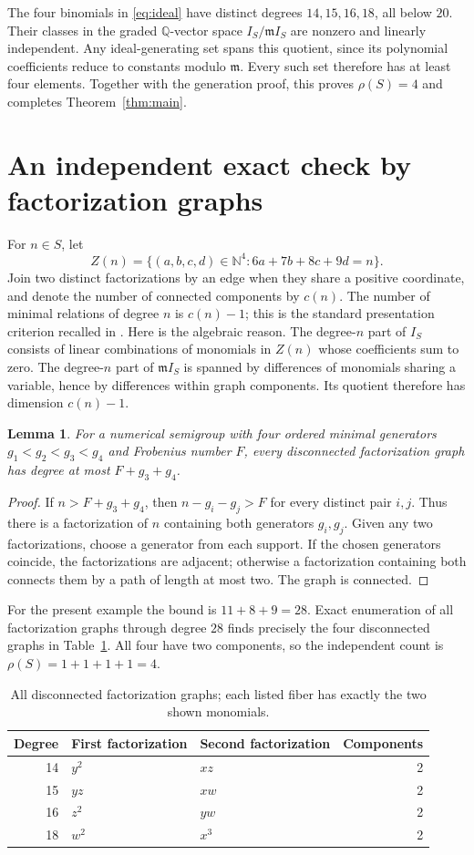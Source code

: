 \documentclass[11pt,a4paper]{article}
\newtheorem{lemma}[theorem]{Lemma}
\newcommand{\NN}{\mathbb N}
\newcommand{\QQ}{\mathbb Q}
\newcommand{\frakm}{\mathfrak m}
\begin{document}
The four binomials in \eqref{eq:ideal} have distinct degrees $14,15,16,18$,
all below $20$. Their classes in the graded $\QQ$-vector space
$I_S/\frakm I_S$ are nonzero and linearly independent. Any ideal-generating
set spans this quotient, since its polynomial coefficients reduce to constants
modulo $\frakm$. Every such set therefore has at least four elements.
Together with the generation proof, this proves $\rho(S)=4$ and completes
Theorem~\ref{thm:main}.

\section{An independent exact check by factorization graphs}
For $n\in S$, let
\[
 Z(n)=\{(a,b,c,d)\in\NN^4:6a+7b+8c+9d=n\}.
\]
Join two distinct factorizations by an edge when they share a positive
coordinate, and denote the number of connected components by $c(n)$.
The number of minimal relations of degree $n$ is $c(n)-1$; this is the
standard presentation criterion recalled in \cite[Theorem 3]{gomes}.
Here is the algebraic reason. The degree-$n$ part of $I_S$ consists of
linear combinations of monomials in $Z(n)$ whose coefficients sum to zero.
The degree-$n$ part of $\frakm I_S$ is spanned by differences of monomials
sharing a variable, hence by differences within graph components.
Its quotient therefore has dimension $c(n)-1$.

\begin{lemma}\label{lem:bound}
For a numerical semigroup with four ordered minimal generators
$g_1<g_2<g_3<g_4$ and Frobenius number $F$, every disconnected
factorization graph has degree at most $F+g_3+g_4$.
\end{lemma}
\begin{proof}
If $n>F+g_3+g_4$, then $n-g_i-g_j>F$ for every distinct pair $i,j$.
Thus there is a factorization of $n$ containing both generators $g_i,g_j$.
Given any two factorizations, choose a generator from each support.
If the chosen generators coincide, the factorizations are adjacent;
otherwise a factorization containing both connects them by a path of
length at most two. The graph is connected.
\end{proof}

For the present example the bound is $11+8+9=28$. Exact enumeration of
all factorization graphs through degree $28$ finds precisely the four
disconnected graphs in Table~\ref{tab:betti}. All four have two components,
so the independent count is $\rho(S)=1+1+1+1=4$.

\begin{table}[ht]
\centering
\begin{tabular}{rllr}
\toprule
Degree & First factorization & Second factorization & Components\\
\midrule
14 & $y^2$ & $xz$ & 2\\
15 & $yz$ & $xw$ & 2\\
16 & $z^2$ & $yw$ & 2\\
18 & $w^2$ & $x^3$ & 2\\
\bottomrule
\end{tabular}
\caption{All disconnected factorization graphs; each listed fiber has exactly
the two shown monomials.}\label{tab:betti}
\end{table}
\end{document}
